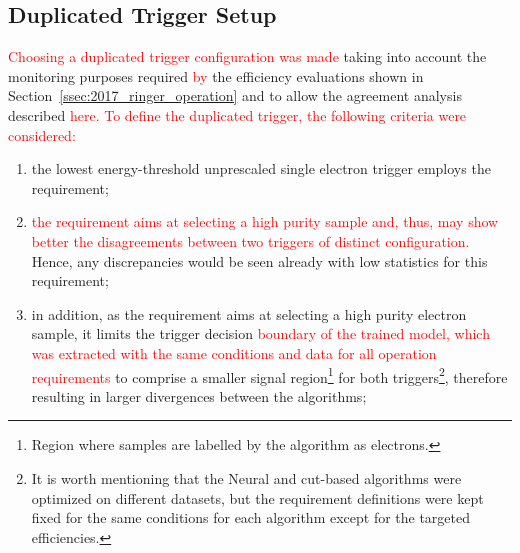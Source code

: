 \subsection{Duplicated Trigger Setup}\label{top:duplicated}

\textcolor{red}{Choosing a duplicated trigger configuration was made} 
taking into account the
monitoring purposes required \textcolor{red}{by} the efficiency evaluations shown in
Section~\ref{ssec:2017_ringer_operation} and to allow the agreement analysis described \textcolor{red}{here. To define the duplicated trigger, the following criteria were considered:}


\begin{enumerate}
  \item the lowest energy-threshold unprescaled single electron trigger employs the \tight requirement;%
  \item \textcolor{red}{the \tight requirement aims at selecting a high purity sample and, thus, may show better the disagreements between two triggers of distinct configuration. }Hence, any discrepancies would be seen already with low statistics for this requirement;%
  \item in addition, as the \tight requirement aims at selecting a high purity electron sample, it limits the trigger decision 
  \textcolor{red}{boundary of the trained model, which was extracted with the same conditions and data for all operation requirements} 
  to comprise a smaller signal region\footnote{Region where samples are labelled by the algorithm as electrons.} for both triggers\footnote{It is worth mentioning that the Neural\rnn{} and cut-based algorithms were optimized on different datasets, but the requirement definitions were kept fixed for the same conditions for each algorithm except for the targeted efficiencies.}, therefore resulting in larger divergences between the algorithms;
  

\end{enumerate}
